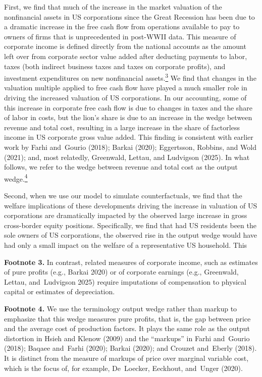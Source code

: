 \documentclass[11pt]{article}
\begin{document}
First, we find that much of the increase in the market valuation of the nonfinancial assets in US corporations since the Great Recession has been due to a dramatic increase in the free cash flow from operations available to pay to owners of firms that is unprecedented in post-WWII data. This measure of corporate income is defined directly from the national accounts as the amount left over from corporate sector value added after deducting payments to labor, taxes (both indirect business taxes and taxes on corporate profits), and investment expenditures on new nonfinancial assets.\hyperlink{fn:3}{\textsuperscript{3}} We find that changes in the valuation multiple applied to free cash flow have played a much smaller role in driving the increased valuation of US corporations. In our accounting, some of this increase in corporate free cash flow is due to changes in taxes and the share of labor in costs, but the lion’s share is due to an increase in the wedge between revenue and total cost, resulting in a large increase in the share of factorless income in US corporate gross value added. This finding is consistent with earlier work by Farhi and Gourio (2018); Barkai (2020); Eggertsson, Robbins, and Wold (2021); and, most relatedly, Greenwald, Lettau, and Ludvigson (2025). In what follows, we refer to the wedge between revenue and total cost as the output wedge.\hyperlink{fn:4}{\textsuperscript{4}}


Second, when we use our model to simulate counterfactuals, we find that the welfare implications of these developments driving the increase in valuation of US corporations are dramatically impacted by the observed large increase in gross cross-border equity positions. Specifically, we find that had US residents been the sole owners of US corporations, the observed rise in the output wedge would have had only a small impact on the welfare of a representative US household. This


{\footnotesize \hypertarget{fn:3}{}\textbf{Footnote 3.} In contrast, related measures of corporate income, such as estimates of pure profits (e.g., Barkai 2020) or of corporate earnings (e.g., Greenwald, Lettau, and Ludvigson 2025) require imputations of compensation to physical capital or estimates of depreciation.\par}


{\footnotesize \hypertarget{fn:4}{}\textbf{Footnote 4.} We use the terminology output wedge rather than markup to emphasize that this wedge measures pure profits, that is, the gap between price and the average cost of production factors. It plays the same role as the output distortion in Hsieh and Klenow (2009) and the “markups” in Farhi and Gourio (2018); Baqaee and Farhi (2020); Barkai (2020); and Crouzet and Eberly (2018). It is distinct from the measure of markups of price over marginal variable cost, which is the focus of, for example, De Loecker, Eeckhout, and Unger (2020).\par}
\end{document}
